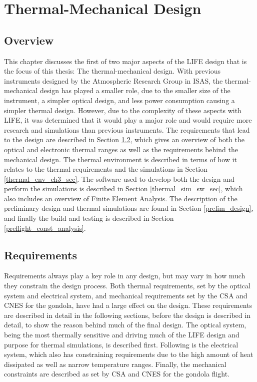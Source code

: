 \chapter{Thermal-Mechanical Design}  \label{thermal}

\section{Overview}
This chapter discusses the first of two major aspects of the LIFE design that is the focus of this thesis: The thermal-mechanical design. With previous instruments designed by the Atmospheric Research Group in ISAS, the thermal-mechanical design has played a smaller role, due to the smaller size of the instrument, a simpler optical design, and less power consumption causing a simpler thermal design. However, due to the complexity of these aspects with LIFE, it was determined that it would play a major role and would require more research and simulations than previous instruments. The requirements that lead to the design are described in Section \ref{thermal_req_section}, which gives an overview of both the optical and electronic thermal ranges as well as the requirements behind the mechanical design. The thermal environment is described in terms of how it relates to the thermal requirements and the simulations in Section \ref{thermal_env_ch3_sec}. The software used to develop both the design and perform the simulations is described in Section \ref{thermal_sim_sw_sec}, which also includes an overview of Finite Element Analysis. The description of the preliminary design and thermal simulations are found in Section \ref{prelim_design}, and finally the build and testing is described in Section \ref{preflight_const_analysis}.

\section{Requirements}\label{thermal_req_section}
Requirements always play a key role in any design, but may vary in how much they constrain the design process. Both thermal requirements, set by the optical system and electrical system, and mechanical requirements set by the CSA and CNES for the gondola, have had a large effect on the design. These requirements are described in detail in the following sections, before the design is described in detail, to show the reason behind much of the final design. The optical system, being the most thermally sensitive and driving much of the LIFE design and purpose for thermal simulations, is described first. Following is the electrical system, which also has constraining requirements due to the high amount of heat dissipated as well as narrow temperature ranges. Finally, the mechanical constraints are described as set by CSA and CNES for the gondola flight.



